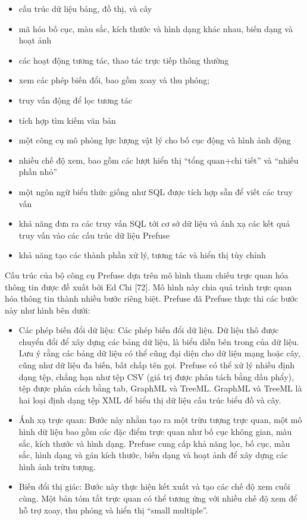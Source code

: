 \documentclass[13pt]{scrartcl} %
\begin{document}
\begin{itemize}
    \item cấu trúc dữ liệu bảng, đồ thị, và cây
    \item mã hóa bố cục, màu sắc, kích thước và hình dạng khác nhau, biến dạng và hoạt ảnh
    \item các hoạt động tương tác, thao tác trực tiếp thông thường
    \item xem các phép biến đổi, bao gồm xoay và thu phóng;
    \item truy vấn động để lọc tương tác
    \item tích hợp tìm kiếm văn bản
    \item một công cụ mô phỏng lực lượng vật lý cho bố cục động và hình ảnh động
    \item nhiều chế độ xem, bao gồm các lượt hiển thị “tổng quan+chi tiết” và “nhiều phần nhỏ”
    \item một ngôn ngữ biểu thức giống như SQL được tích hợp sẵn để viết các truy vấn
    \item khả năng đưa ra các truy vấn SQL tới cơ sở dữ liệu và ánh xạ các kết quả truy vấn vào các cấu trúc dữ liệu Prefuse
    \item khả năng tạo các thành phần xử lý, tương tác và hiển thị tùy chỉnh

\end{itemize}

Cấu trúc của bộ công cụ Prefuse dựa trên mô hình tham chiếu trực quan hóa thông tin được đề xuất bởi Ed Chi [72]. Mô hình này chia quá trình trực quan hóa thông tin thành nhiều bước riêng biệt. Prefuse đã Prefuse thực thi các bước này như hình bên dưới:

\begin{itemize}
    \item Các phép biến đổi dữ liệu: Các phép biến đổi dữ liệu. Dữ liệu thô được chuyển đổi để xây dựng các bảng dữ liệu, là biểu diễn bên trong của dữ liệu. Lưu ý rằng các bảng dữ liệu có thể cũng đại diện cho dữ liệu mạng hoặc cây, cũng như dữ liệu đa biến, bất chấp tên gọi. Prefuse có thể xử lý nhiều định dạng tệp, chẳng hạn như tệp CSV (giá trị được phân tách bằng dấu phẩy), tệp được phân cách bằng tab, GraphML và TreeML. GraphML và TreeML là hai loại định dạng tệp XML để biểu thị dữ liệu cấu trúc biểu đồ và cây.
    \item Ánh xạ trực quan: Bước này nhằm tạo ra một trừu tượng trực quan, một mô hình dữ liệu bao gồm các đặc điểm trực quan như bố cục không gian, màu sắc, kích thước và hình dạng.
          Prefuse cung cấp khả năng lọc, bố cục, màu sắc, hình dạng và gán kích thước, biến dạng và hoạt ảnh để xây dựng các hình ảnh trừu tượng.

    \item Biến đổi thị giác: Bước này thực hiện kết xuất và tạo các chế độ xem cuối cùng. Một bản tóm tắt trực quan có thể tương ứng với nhiều chế độ xem để hỗ trợ xoay, thu phóng và hiển thị “small multiple”.
\end{itemize}
\end{document}
